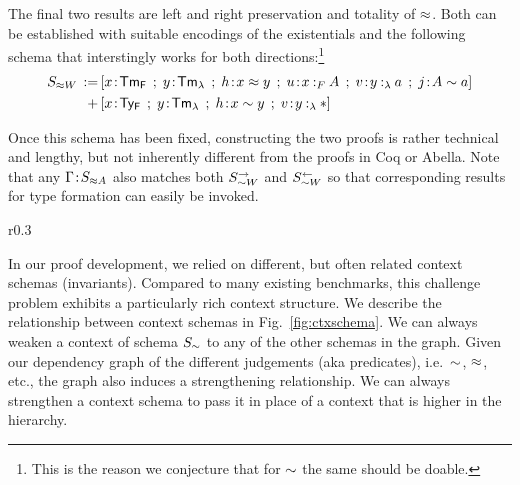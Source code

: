 The final two results are left and right preservation and totality of $\mathrel{\approx}$.
Both can be established with suitable encodings of the existentials and the following schema that interstingly works for both directions:\footnote{This is the reason we conjecture that for $\mathrel{\sim}$ the same should be doable.}
\begin{align*}
  S_{\tmr W} \eqdef &[x\of\TmF \mrel{;} y\of\TmL \mrel{;} h\of x \tmr y \mrel{;} u\of\typingFh{x}{A} \mrel{;} v\of\typingLh{y}{a} \mrel{;} j \of A \tyr a]\\
  \mrel{+} &[x\of\TyF \mrel{;} y\of\TmL \mrel{;} h\of x \tyr y \mrel{;} v\of\typingLh{y}{\Prp}]
\end{align*}

Once this schema has been fixed, constructing the two proofs is rather technical and lengthy, but not inherently different from the proofs in Coq or Abella.
Note that any $\Gamma \!:\! S_{\mathrel{\approx} A}$ also matches both $S_{\mathrel{\sim} W}^{\rightarrow}$ and $S_{\mathrel{\sim} W}^{\leftarrow}$ so that corresponding results for type formation can easily be invoked.


\begin{wrapfigure}{r}{0.3\textwidth}
  \centering
\begin{minipage}{4.5cm}
  \end{minipage}  
  \caption{Dependencies between Context Schemas}
  \label{fig:ctxschema}
\end{wrapfigure}
In our proof development, we relied on different, but often related context schemas (invariants). 
Compared to many existing benchmarks, this challenge problem exhibits a particularly rich context structure. 
We describe the relationship between context schemas in Fig.~\ref{fig:ctxschema}. We can always weaken a context of schema $S_{\mathrel{\sim}}$ to any of the other schemas in the graph. Given our dependency graph of the different judgements (aka predicates), i.e.~$\mathrel{\sim}$, $\mathrel{\approx}$, etc., the graph also induces a strengthening relationship. We can always strengthen a context schema to pass it in place of a context that is higher in the hierarchy. 






